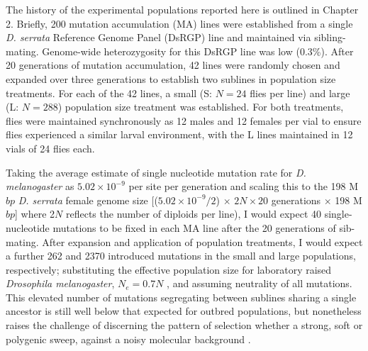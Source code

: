 The history of the experimental populations reported here is outlined in Chapter 2. Briefly, 200 mutation accumulation (MA) lines were established from a single \textit{D. serrata} Reference Genome Panel (DsRGP) line \citep{Redd18} and maintained via sibling-mating. Genome-wide heterozygosity for this DsRGP line was low (0.3\%). After 20 generations of mutation accumulation, 42 lines were randomly chosen and expanded over three generations to establish two sublines in population size treatments. For each of the 42 lines, a small (S: $N = 24$ flies per line) and large (L: $N = 288$) population size treatment was established. For both treatments, flies were maintained synchronously as 12 males and 12 females per vial to ensure flies experienced a similar larval environment, with the L lines maintained in 12 vials of 24 flies each. \par

Taking the average estimate of single nucleotide mutation rate for \textit{D. melanogaster} as $5.02\times10^{-9}$ per site per generation \citep{Katj19} and scaling this to the 198 M$bp$ \textit{D. serrata} female genome size \citep{Alle17B}[($5.02\times10^{-9}/2$) $\times$ $2N \times 20$ generations $\times$ 198 M$bp$] where 2$N$ reflects the number of diploids per line), I would expect 40 single-nucleotide mutations to be fixed in each MA line after the 20 generations of sib-mating. After expansion and application of population treatments, I would expect a further 262 and 2370 introduced mutations in the small and large populations, respectively; substituting the effective population size for laboratory raised \textit{Drosophila melanogaster}, $N_e = 0.7N$ \citep{Crow55}, and assuming neutrality of all mutations. This elevated number of mutations segregating between sublines sharing a single ancestor is still well below that expected for outbred populations, but nonetheless raises the challenge of discerning the pattern of selection whether a strong, soft or polygenic sweep, against a noisy molecular background \citep{Wals18}.\par

